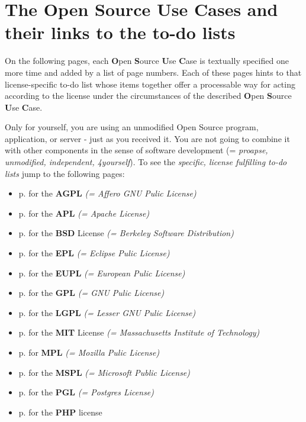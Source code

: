 \section{The Open Source Use Cases and their links to the to-do lists}

On the following pages, each \textbf{O}pen \textbf{S}ource \textbf{U}se
\textbf{C}ase is textually specified one more time and added by a list of page
numbers. Each of these pages hints to that license-specific to-do list whose
items together offer a processable way for acting according to the license under
the circumstances of the described \textbf{O}pen \textbf{S}ource \textbf{U}se
\textbf{C}ase.

\begin{description}
\label{OSUCList}
\item[OSUC-01:]\label{OSUC-01-DEF}
Only for yourself, you are using an unmodified Open Source program, application,
or server - just as you received it. You are not going to combine it with other
components in the sense of software development (= \textit{proapse, unmodified,
independent, 4yourself}). 
To see the \textit{specific, license fulfilling to-do lists} jump to the
following pages:
  \begin{itemize}
    \item p. \pageref{OSUC-01-AGPL} for the \textbf{AGPL}
      \textit{(= Affero GNU Pulic License)} 
    \item p. \pageref{OSUC-01-Apache20} for the \textbf{APL}
      \textit{(= Apache License)}
    \item p. \pageref{OSUC-01-BSD} for the \textbf{BSD} License
      \textit{(= Berkeley Software Distribution)}
    \item p. \pageref{OSUC-01-EPL} for the \textbf{EPL}
      \textit{(= Eclipse Pulic License)}     
    \item p. \pageref{OSUC-01-EUPL} for the \textbf{EUPL}
      \textit{(= European Pulic License)} 
    \item p. \pageref{OSUC-01-GPL} for the \textbf{GPL}
       \textit{(= GNU Pulic License)} 
    \item p. \pageref{OSUC-01-LGPL} for the \textbf{LGPL}
      \textit{(= Lesser GNU Pulic License)}           
    \item p. \pageref{OSUC-01-MIT} for the \textbf{MIT} License
       \textit{(= Massachusetts Institute of Technology)} 
    \item p. \pageref{OSUC-01-MPL} for \textbf{MPL}
      \textit{(= Mozilla Pulic License)}     
    \item p. \pageref{OSUC-01-MsPL} for the \textbf{MSPL}
      \textit{(= Microsoft Public License)} 
    \item p. \pageref{OSUC-01-PGL} for the \textbf{PGL}
      \textit{(= Postgres License)} 
    \item p. \pageref{OSUC-01-PHP} for the \textbf{PHP} license 
  \end{itemize}


\end{description}
